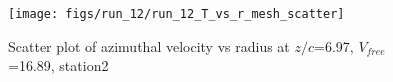 \begin{figure}[H]
\centering
\texttt{[image: figs/run\_12/run\_12\_T\_vs\_r\_mesh\_scatter]}
\caption{Scatter plot of azimuthal velocity vs radius at $z/c$=6.97, $V_{free}$=16.89, station2}
\label{fig:run_12_T_vs_r_mesh_scatter}
\end{figure}


